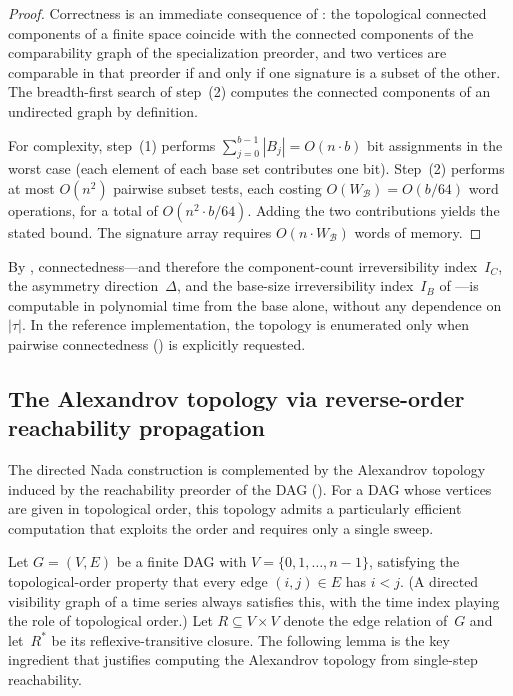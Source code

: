 \documentclass[11pt,a4paper]{article}
\theoremstyle{plain}
\theoremstyle{definition}
\newcommand{\base}{\mathcal{B}}
\begin{document}
\begin{proof}
Correctness is an immediate consequence of
: the topological connected components
of a finite space coincide with the connected components of the
comparability graph of the specialization preorder, and two vertices are
comparable in that preorder if and only if one signature is a subset of the
other.  The breadth-first search of step~(2) computes the connected
components of an undirected graph by definition.

For complexity, step~(1) performs
$\sum_{j=0}^{b-1} |B_j| = O(n \cdot b)$ bit assignments in the worst case
(each element of each base set contributes one bit).  Step~(2) performs at
most $O(n^{2})$ pairwise subset tests, each costing $O(W_{\base}) =
O(b / 64)$ word operations, for a total of $O(n^{2} \cdot b / 64)$.  Adding
the two contributions yields the stated bound.  The signature array
requires $O(n \cdot W_{\base})$ words of memory.
\end{proof}

By , connectedness---and therefore
the component-count irreversibility index~$I_C$, the asymmetry
direction~$\Delta$, and the base-size irreversibility index~$I_B$ of
---is computable in polynomial time
from the base alone, without any dependence on~$|\tau|$.  In the reference implementation, the topology is enumerated
only when pairwise connectedness () is
explicitly requested.


\subsection{The Alexandrov topology via reverse-order reachability
propagation}%
\label{subsec:alexandrov-algorithm}

The directed Nada construction is complemented by the Alexandrov topology
induced by the reachability preorder of the DAG
().  For a DAG whose vertices are given in
topological order, this topology admits a particularly efficient computation
that exploits the order and requires only a single sweep.

Let $G = (V, E)$ be a finite DAG with $V = \{0, 1, \ldots, n-1\}$, satisfying
the topological-order property that every edge $(i, j) \in E$ has $i < j$.
(A directed visibility graph of a time series always satisfies this, with
the time index playing the role of topological order.)  Let
$R \subseteq V \times V$ denote the edge relation of~$G$ and let~$R^{*}$ be
its reflexive-transitive closure.  The following lemma is the key ingredient
that justifies computing the Alexandrov topology from single-step
reachability.
\end{document}
